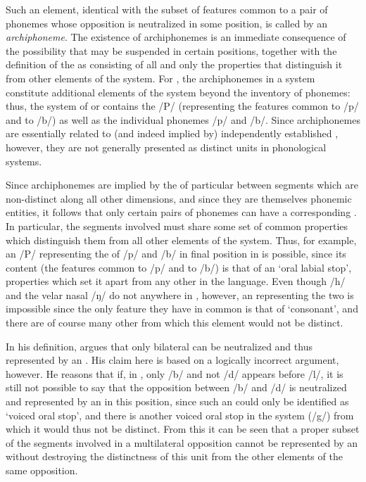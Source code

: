Such an element, identical with the subset of features common to a
pair of phonemes whose opposition is neutralized in some position, is
called by {\Trubetzkoy} an \emph{archiphoneme}. The existence of
archiphonemes is an immediate consequence of the possibility that
 may be suspended in certain positions, together with the
definition of the  as consisting of all and only the properties
that distinguish it from other elements of the system. For {\Trubetzkoy},
the archiphonemes in a system constitute additional elements of the
system beyond the inventory of phonemes: thus, the system of  or
 contains the  /P/ (representing the features
common to /p/ and to /b/) as well as the individual phonemes /p/ and
/b/. Since archiphonemes are essentially related to (and indeed
implied by) independently established , however, they are
not generally presented as distinct units in phonological systems.

Since archiphonemes are implied by the  of particular
 between segments which are non-distinct along all other
dimensions, and since they are themselves phonemic entities, it
follows that only certain pairs of phonemes can have a corresponding
. In particular, the segments involved must share some set
of common properties which distinguish them from all other elements of
the system. Thus, for example, an  /P/ representing the
 of /p/ and /b/ in final position in  is possible,
since its content (the features common to /p/ and to /b/) is that of
an `oral labial stop', properties which set it apart from any other
 in the language. Even though /h/ and the velar nasal /ŋ/ do
not  anywhere in , however, an 
representing the two is impossible since the only feature they have in
common is that of `consonant', and there are of course many other
 from which this element would not be distinct.

In his definition, {\Trubetzkoy} argues that only bilateral 
can be neutralized and thus represented by an . His claim
here is based on a logically incorrect argument, however. He reasons
that if, in , only /b/ and not /d/ appears before /l/, it is
still not possible to say that the opposition between /b/ and /d/ is
neutralized and represented by an  in this position, since
such an  could only be identified as `voiced oral stop',
and there is another voiced oral stop in the system (/g/) from which
it would thus not be distinct. From this it can be seen that a proper
subset of the segments involved in a multilateral opposition cannot be
represented by an  without destroying the distinctness of
this unit from the other elements of the same opposition.

